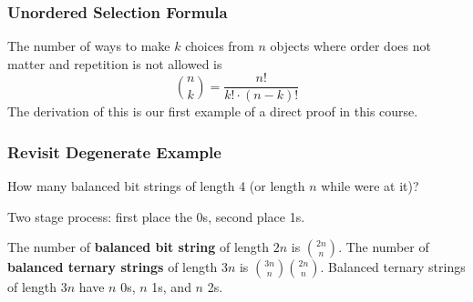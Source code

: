 \documentclass{beamer}
\begin{document}
\frame
{
  \frametitle{Unordered Selection Formula}

The number of ways to make $k$ choices from $n$ objects where order does not matter and repetition is not allowed is 
\vfill
$$\binom{n}{k}=\frac{n!}{k! \cdot (n-k)!}$$
\vfill
The derivation of this is our first example of a direct proof in this course.
}


\frame
{
  \frametitle{Revisit Degenerate Example}

How many balanced bit strings of length 4 (or length $n$ while were at it)? \vfill

Two stage process:  first place the 0s, second place 1s.

The number of {\bf balanced bit string} of length $2n$ is $\binom{2n}{n}$.
\vfill
The number of {\bf balanced ternary strings} of length $3n$ is $\binom{3n}{n}\binom{2n}{n}$.  Balanced ternary strings of length $3n$ have $n$ 0s, $n$ 1s, and $n$ 2s.

}
\end{document}
